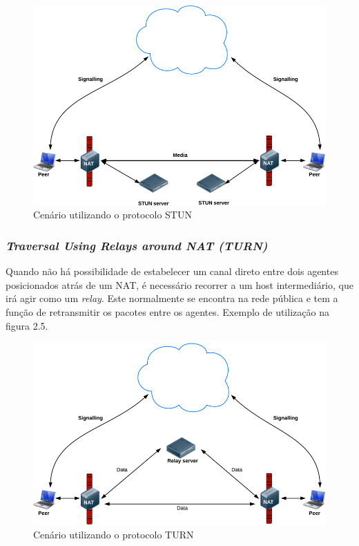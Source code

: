 \documentclass[12pt,a4paper,oneside]{report}
\begin{document}
\begin{figure}[!htdb]
 \centering
  \includegraphics[width = 1\linewidth]{images/stun}
  \caption{Cenário utilizando o protocolo STUN} %
  \label{f_mediaStream}
\end{figure}

\subsubsection{\textit{Traversal Using Relays around NAT (TURN)}}

Quando não há possibilidade de estabelecer um canal direto entre dois agentes posicionados atrás de um NAT, é necessário recorrer a um host intermediário, que irá agir como um \textit{relay}. Este normalmente se encontra na rede pública e tem a função de retransmitir os pacotes entre os agentes\cite{Varanda:2008}. Exemplo de utilização na figura 2.5.


\begin{figure}[!htdb]
 \centering
  \includegraphics[width = 1\linewidth]{images/turn}
  \caption{Cenário utilizando o protocolo TURN} %
  \label{f_mediaStream}
\end{figure}
\end{document}
